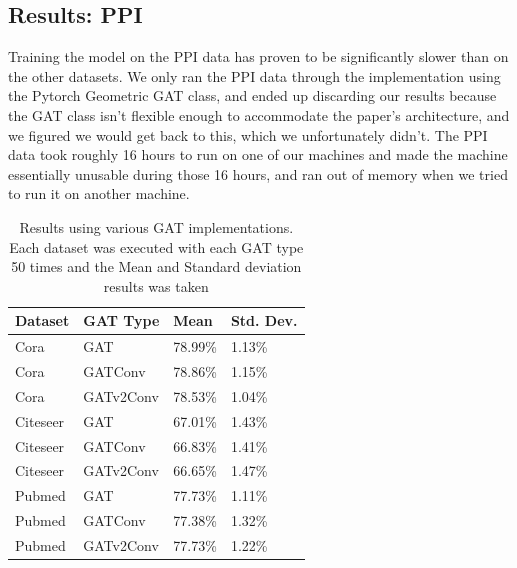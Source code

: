 \subsection{Results: PPI}\label{subsec:results:-ppi}
Training the model on the PPI data has proven to be significantly slower than
on the other datasets. We only ran the PPI data through the implementation
using the Pytorch Geometric GAT class, and ended up discarding our results
because the GAT class isn't flexible enough to accommodate the paper's
architecture, and we figured we would get back to this, which we unfortunately
didn't. The PPI data took roughly 16 hours to run on one of our machines and
made the machine essentially unusable during those 16 hours, and ran out of
memory when we tried to run it on another machine.

\begin{table}
    \centering
    \begin{tabular}{@{}llll@{}}
        \toprule
        \textbf{Dataset} & \textbf{GAT Type} & \textbf{Mean} & \textbf{Std. Dev.}\\
        \midrule
        Cora             &  {GAT}            &  {78.99}\%      & {1.13}\%             \\
        Cora             &  {GATConv}        &  {78.86}\%      & {1.15}\%             \\
        Cora             &  {GATv2Conv}      &  {78.53}\%      & {1.04}\%             \\
        Citeseer         &  {GAT}            &  {67.01}\%      & {1.43}\%             \\
        Citeseer         &  {GATConv}        &  {66.83}\%      & {1.41}\%             \\
        Citeseer         &  {GATv2Conv}      &  {66.65}\%      & {1.47}\%             \\
        Pubmed           &  {GAT}            &  {77.73}\%      & {1.11}\%             \\
        Pubmed           &  {GATConv}        &  {77.38}\%      & {1.32}\%             \\
        Pubmed           &  {GATv2Conv}      &  {77.73}\%      & {1.22}\%             \\
        \bottomrule

    \end{tabular}
    \caption{Results using various GAT implementations. Each dataset was executed with each GAT type 50 times
    and the Mean and Standard deviation results was taken}
    \label{tab:results-table}
\end{table}


